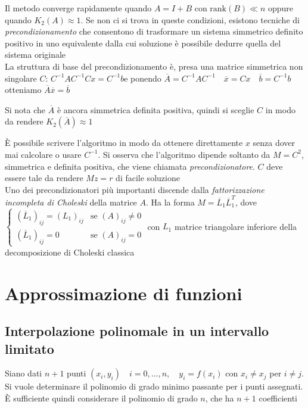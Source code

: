 \documentclass[openany]{book}
\begin{document}
Il metodo converge rapidamente quando $A=I+B$ con $\text{rank}(B)\ll n$ oppure quando $K_2(A)\approx 1$. 
Se non ci si trova in queste condizioni, esistono tecniche di \textit{precondizionamento} che consentono di 
trasformare un sistema simmetrico definito positivo in uno equivalente dalla cui soluzione è possibile 
dedurre quella del sistema originale 
\\

La struttura di base del precondizionamento è, presa una matrice simmetrica non singolare 
$C$: $C^{-1}AC^{-1}Cx=C^{-1}b$\quad e ponendo $\overline{A}=C^{-1}AC^{-1} \quad \overline{x}=Cx 
\quad \overline{b}=C^{-1}b$\quad otteniamo $\overline{A}\overline{x}=\overline{b}$

Si nota che $\overline{A}$ è ancora simmetrica definita positiva, quindi si sceglie $C$ in modo da rendere 
$K_2(\overline{A})\approx 1$

È possibile scrivere l'algoritmo in modo da ottenere direttamente $x$ senza dover mai calcolare o usare 
$C^{-1}$. Si osserva che l'algoritmo dipende soltanto da $M=C^2$, simmetrica e definita positiva, che viene 
chiamata \textit{precondizionatore}. $C$ deve essere tale da rendere $Mz=r$ di facile soluzione 
\\

Uno dei precondizionatori più importanti discende dalla \textit{fattorizzazione incompleta di Choleski} della 
matrice $A$. Ha la forma $M=\overline{L}_1\overline{L}_1^T$, dove
$\left\{ \begin{array}{ll}(\overline{L}_1)_{ij}=(L_1)_{ij} & \text{se } (A)_{ij}\neq 0 
\\ (\overline{L}_1)_{ij}=0 & \text{se } (A)_{ij}=0\end{array} \right.$ con $L_1$ matrice triangolare 
inferiore della decomposizione di Choleski classica

\chapter{Approssimazione di funzioni}

\section{Interpolazione polinomale in un intervallo limitato}

Siano dati $n+1$ punti $(x_i,y_i)\quad i=0,...,n,\quad y_i=f(x_i)$ con $x_i\neq x_j$ per $i\neq j$. Si vuole 
determinare il polinomio di grado minimo passante per i punti assegnati. È sufficiente quindi considerare il 
polinomio di grado $n$, che ha $n+1$ coefficienti
\\
\end{document}
